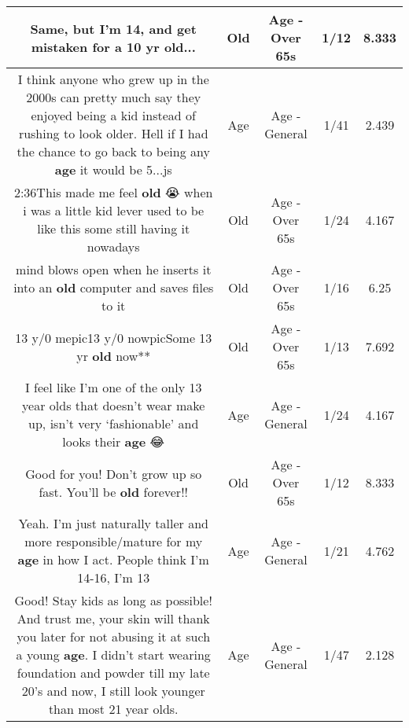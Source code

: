\documentclass[11pt]{article}
\newlength\mylength
\begin{document}
\begin{center}
\begin{longtable}{|C{.65\mylength}|C{.30\mylength}|C{.12\mylength}|C{.12\mylength}|C{.12\mylength}|}
  \small Same, but I'm 14, and get mistaken for a 10 yr \textbf{old}...\normalsize   & Old & Age - Over 65s & 1/12 & 8.333 \\  \hline
  \small I think anyone who grew up in the 2000s can pretty much say they enjoyed being a kid instead of rushing to look older. Hell if I had the chance to go back to being any \textbf{age} it would be 5...js\normalsize   & Age & Age - General & 1/41 & 2.439 \\  \hline
  \small 2:36This made me feel \textbf{old} 😭 when i was a little kid lever used to be like this some still having it nowadays\normalsize   & Old & Age - Over 65s & 1/24 & 4.167 \\  \hline
  \small mind blows open when he inserts it into an \textbf{old} computer and saves files to it\normalsize   & Old & Age - Over 65s & 1/16 & 6.25 \\  \hline
  \small 13 y/0 mepic13 y/0 nowpicSome 13 yr \textbf{old} now**\normalsize   & Old & Age - Over 65s & 1/13 & 7.692 \\  \hline
  \small I feel like I'm one of the only 13 year olds that doesn't wear make up, isn't very ‘fashionable' and looks their \textbf{age} 😂\normalsize   & Age & Age - General & 1/24 & 4.167 \\  \hline
  \small Good for you! Don't grow up so fast. You'll be \textbf{old} forever!!\normalsize   & Old & Age - Over 65s & 1/12 & 8.333 \\  \hline
  \small Yeah. I'm just naturally taller and more responsible/mature for my \textbf{age} in how I act. People think I'm 14-16, I'm 13\normalsize   & Age & Age - General & 1/21 & 4.762 \\  \hline
  \small Good! Stay kids as long as possible! And trust me, your skin will thank you later for not abusing it at such a young \textbf{age}. I didn't start wearing foundation and powder till my late 20's and now, I still look younger than most 21 year olds.\normalsize   & Age & Age - General & 1/47 & 2.128 \\  \hline

\end{longtable}
\end{center}
\end{document}
